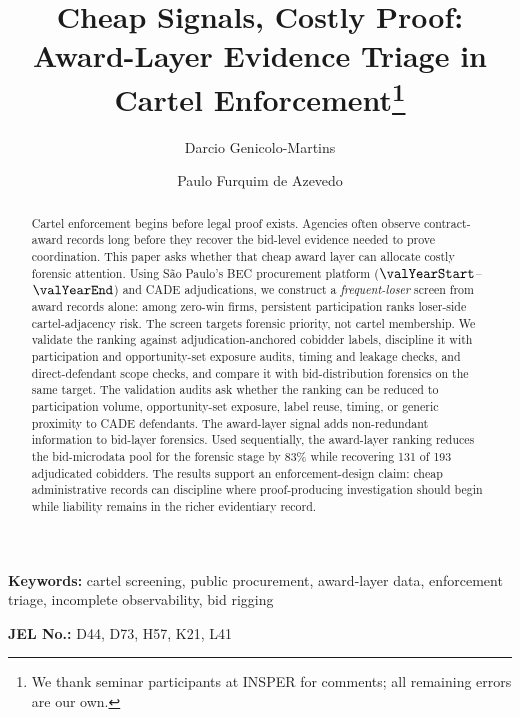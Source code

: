 \begin{frontmatter}

\title{Cheap Signals, Costly Proof: Award-Layer Evidence Triage in Cartel Enforcement\texorpdfstring{\footnote{We thank seminar participants at INSPER for comments; all remaining errors are our own.}}{}}

\author[insper]{Darcio Genicolo-Martins}
\author[insper]{Paulo Furquim de Azevedo}

\begin{abstract}
Cartel enforcement begins before legal proof exists. Agencies
often observe contract-award records long before they recover
the bid-level evidence needed to prove coordination. This paper
asks whether that cheap award layer can allocate costly
forensic attention. Using S\~ao Paulo's BEC procurement platform
($\valYearStart$--$\valYearEnd$) and CADE adjudications, we
construct a \emph{frequent-loser} screen from award records
alone: among zero-win firms, persistent participation ranks
loser-side cartel-adjacency risk. The screen targets forensic
priority, not cartel membership. We validate the ranking against
adjudication-anchored cobidder labels, discipline it with
participation and opportunity-set exposure audits, timing and
leakage checks, and direct-defendant scope checks, and compare
it with bid-distribution forensics on the same target. The
validation audits ask whether the ranking can be reduced to
participation volume, opportunity-set exposure, label reuse, timing, or
generic proximity to CADE defendants. The
award-layer signal adds non-redundant information to bid-layer
forensics. Used sequentially, the award-layer ranking
reduces the bid-microdata pool for the forensic stage by 83\%
while recovering 131 of 193 adjudicated cobidders. The
results support an enforcement-design claim: cheap administrative
records can discipline where proof-producing investigation
should begin while liability remains in the richer evidentiary
record.
\end{abstract}

\end{frontmatter}

\noindent\textbf{Keywords:} cartel screening, public procurement, award-layer data, enforcement triage, incomplete observability, bid rigging

\noindent\textbf{JEL No.:} D44, D73, H57, K21, L41

\bigskip
